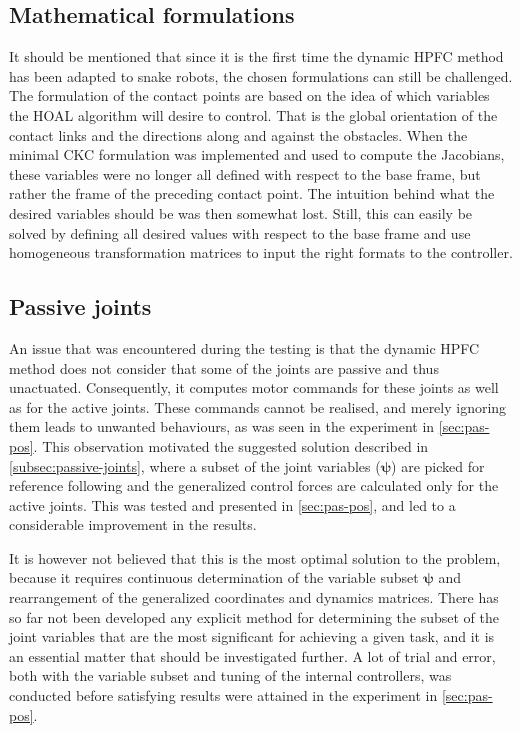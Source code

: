 \subsection{Mathematical formulations}

It should be mentioned that since it is the first time the dynamic HPFC method has been adapted to snake robots, the chosen formulations can still be challenged. The formulation of the contact points are based on the idea of which variables the HOAL algorithm will desire to control. That is the global orientation of the contact links and the directions along and against the obstacles. When the minimal CKC formulation was implemented and used to compute the Jacobians, these variables were no longer all defined with respect to the base frame, but rather the frame of the preceding contact point. The intuition behind what the desired variables should be was then somewhat lost. Still, this can easily be solved by defining all desired values with respect to the base frame and use homogeneous transformation matrices to input the right formats to the controller.

\subsection{Passive joints}\label{subsec:dis-passive-joints}

An issue that was encountered during the testing is that the dynamic HPFC method does not consider that some of the joints are passive and thus unactuated. Consequently, it computes motor commands for these joints as well as for the active joints. These commands cannot be realised, and merely ignoring them leads to unwanted behaviours, as was seen in the experiment in \ref{sec:pas-pos}. This observation motivated the suggested solution described in \ref{subsec:passive-joints}, where a subset of the joint variables ($\boldsymbol{\psi}$) are picked for reference following and the generalized control forces are calculated only for the active joints. This was tested and presented in \ref{sec:pas-pos}, and led to a considerable improvement in the results.

It is however not believed that this is the most optimal solution to the problem, because it requires continuous determination of the variable subset $\boldsymbol{\psi}$ and rearrangement of the generalized coordinates and dynamics matrices. There has so far not been developed any explicit method for determining the subset of the joint variables that are the most significant for achieving a given task, and it is an essential matter that should be investigated further. A lot of trial and error, both with the variable subset and tuning of the internal controllers, was conducted before satisfying results were attained in the experiment in \ref{sec:pas-pos}.

